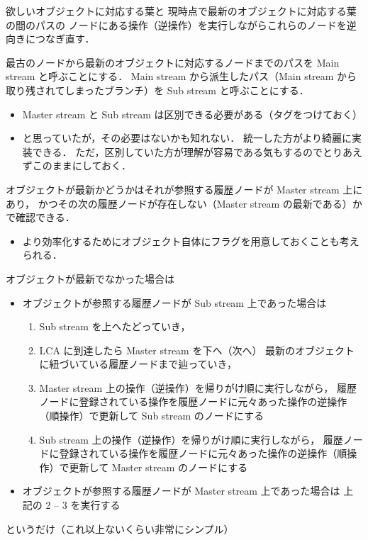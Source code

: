 \documentclass[10pt, a4j, twocolumn]{scrartcl}
\begin{document}
欲しいオブジェクトに対応する葉と
現時点で最新のオブジェクトに対応する葉の間のパスの
ノードにある操作（逆操作）を実行しながらこれらのノードを逆向きにつなぎ直す．

最古のノードから最新のオブジェクトに対応するノードまでのパスを
Main stream と呼ぶことにする．
Main stream から派生したパス（Main stream から取り残されてしまったブランチ）を
Sub stream と呼ぶことにする．
\begin{itemize}
\item Master stream と Sub stream は区別できる必要がある（タグをつけておく）
\item と思っていたが，その必要はないかも知れない．
統一した方がより綺麗に実装できる．
ただ，区別していた方が理解が容易である気もするのでとりあえずこのままにしておく．
\end{itemize}



オブジェクトが最新かどうかはそれが参照する履歴ノードが Master stream 上にあり，
かつその次の履歴ノードが存在しない（Master stream の最新である）かで確認できる．
\begin{itemize}
\item より効率化するためにオブジェクト自体にフラグを用意しておくことも考えられる．
\end{itemize}


オブジェクトが最新でなかった場合は
\begin{itemize}
\item オブジェクトが参照する履歴ノードが Sub stream 上であった場合は
\begin{enumerate}
\item Sub stream を上へたどっていき，
\item LCA に到達したら Master stream を下へ（次へ）
最新のオブジェクトに紐づいている履歴ノードまで辿っていき，
\item Master stream 上の操作（逆操作）を帰りがけ順に実行しながら，
履歴ノードに登録されている操作を履歴ノードに元々あった操作の逆操作（順操作）で更新して
Sub stream のノードにする
\item Sub stream 上の操作（逆操作）を帰りがけ順に実行しながら，
履歴ノードに登録されている操作を履歴ノードに元々あった操作の逆操作（順操作）で更新して
Master stream のノードにする
\end{enumerate}
\item オブジェクトが参照する履歴ノードが Master stream 上であった場合は
上記の 2 -- 3 を実行する
\end{itemize}


というだけ（これ以上ないくらい非常にシンプル）
\end{document}

